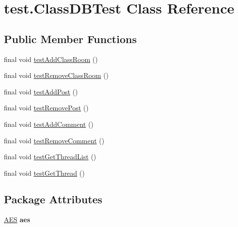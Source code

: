 \hypertarget{classtest_1_1_class_d_b_test}{
\section{test.\-Class\-D\-B\-Test \-Class \-Reference}
\label{classtest_1_1_class_d_b_test}
}
\subsection*{\-Public \-Member \-Functions}
\begin{DoxyCompactItemize}
\item 
final void \hyperlink{classtest_1_1_class_d_b_test_a6100903556a6302ac6a4237c9ccd0fc0}{test\-Add\-Class\-Room} ()
\item 
final void \hyperlink{classtest_1_1_class_d_b_test_aed0dcfe6146174126ee743340d77b5cd}{test\-Remove\-Class\-Room} ()
\item 
final void \hyperlink{classtest_1_1_class_d_b_test_aa838ad62ea2a29e227dc90206d7e128b}{test\-Add\-Post} ()
\item 
final void \hyperlink{classtest_1_1_class_d_b_test_a729eb74f16a8ffe3b7676e19a347dacf}{test\-Remove\-Post} ()
\item 
final void \hyperlink{classtest_1_1_class_d_b_test_aa44ac3b5bdc3080d92493d39e805edf7}{test\-Add\-Comment} ()
\item 
final void \hyperlink{classtest_1_1_class_d_b_test_a82d21de62b8da6a307c46b22069f4d56}{test\-Remove\-Comment} ()
\item 
final void \hyperlink{classtest_1_1_class_d_b_test_aecc12c72b2e5c1ac65faa3fe38f09a9a}{test\-Get\-Thread\-List} ()
\item 
final void \hyperlink{classtest_1_1_class_d_b_test_a8d6e076d50aa0090c24f7cb6a1cff8f5}{test\-Get\-Thread} ()
\end{DoxyCompactItemize}
\subsection*{\-Package \-Attributes}
\begin{DoxyCompactItemize}
\item 
\hypertarget{classtest_1_1_class_d_b_test_ae770ed95977ac03bafce881c1e3d4540}{
\hyperlink{classsecurity_1_1_a_e_s}{\-A\-E\-S} {\bfseries aes}}
\label{classtest_1_1_class_d_b_test_ae770ed95977ac03bafce881c1e3d4540}

\end{DoxyCompactItemize}


